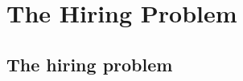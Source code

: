 \documentclass[notes,serif]{beamer}
\begin{document}
%
%
%
%
%
%
%
%

\section{The Hiring Problem}

\subsection{The hiring problem}
\end{document}
